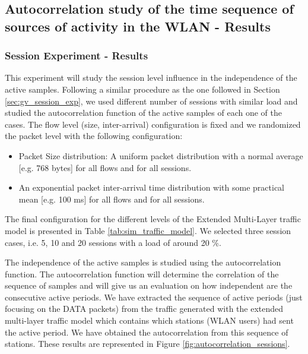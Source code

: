 \subsection{Autocorrelation study of the time sequence of sources of activity in the WLAN - Results} \label{sec:autocorrelation_active_results}

\subsubsection{Session Experiment - Results} \label{subsec:autocorrelation_sessions}
This experiment will study the session level influence in the independence of the active samples. Following a similar procedure as the one followed in Section \ref{sec:gv_session_exp}, we used different number of sessions with similar load and studied the autocorrelation function of the active samples of each one of the cases. The flow level (size, inter-arrival) configuration is fixed and we randomized the packet level with the following configuration:

\begin{itemize}
\item Packet Size distribution: A uniform packet distribution with a normal average [e.g. 768 bytes] for all flows and for all sessions.
\item An exponential packet inter-arrival time distribution with some practical mean [e.g. 100 ms] for all flows and for all sessions.
\end{itemize}

The final configuration for the different levels of the Extended Multi-Layer traffic model is presented in Table \ref{tab:sim_traffic_model}. We selected three session cases, i.e. 5, 10 and 20 sessions with a load of around 20 \%.

The independence of the active samples is studied using the autocorrelation function. The autocorrelation function will determine the correlation of the sequence of samples and will give us an evaluation on how independent are the consecutive active periods. We have extracted the sequence of active periods (just focusing on the DATA packets) from the traffic generated with the extended multi-layer traffic model which contains which stations (\acs{WLAN} users) had sent the active period. We have obtained the autocorrelation from this sequence of stations. These results are represented in Figure \ref{fig:autocorrelation_sessions}.

